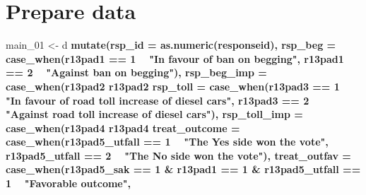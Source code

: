 \documentclass[]{book}
\newenvironment{Shaded}{\begin{snugshade}}{\end{snugshade}}
\newcommand{\KeywordTok}[1]{\textcolor[rgb]{0.13,0.29,0.53}{\textbf{#1}}}
\newcommand{\DataTypeTok}[1]{\textcolor[rgb]{0.13,0.29,0.53}{#1}}
\newcommand{\DecValTok}[1]{\textcolor[rgb]{0.00,0.00,0.81}{#1}}
\newcommand{\StringTok}[1]{\textcolor[rgb]{0.31,0.60,0.02}{#1}}
\newcommand{\OperatorTok}[1]{\textcolor[rgb]{0.81,0.36,0.00}{\textbf{#1}}}
\newcommand{\NormalTok}[1]{#1}
\begin{document}
\section{Prepare data}\label{prepare-data-7}

\begin{Shaded}
\begin{Highlighting}[]
\NormalTok{main_}\DecValTok{01}\NormalTok{ <-}\StringTok{ }\NormalTok{d }\OperatorTok{%>%}\StringTok{ }
\StringTok{  }\KeywordTok{mutate}\NormalTok{(}\DataTypeTok{rsp_id =} \KeywordTok{as.numeric}\NormalTok{(responseid),}
         \DataTypeTok{rsp_beg =} \KeywordTok{case_when}\NormalTok{(r13pad1 }\OperatorTok{==}\StringTok{ }\DecValTok{1} \OperatorTok{~}\StringTok{ "In favour of ban on begging"}\NormalTok{,}
\NormalTok{                             r13pad1 }\OperatorTok{==}\StringTok{ }\DecValTok{2} \OperatorTok{~}\StringTok{ "Against ban on begging"}\NormalTok{),}
          \DataTypeTok{rsp_beg_imp =} \KeywordTok{case_when}\NormalTok{(r13pad2 }\OperatorTok{%in%}\StringTok{ }\DecValTok{1}\OperatorTok{:}\DecValTok{2} \OperatorTok{~}\StringTok{ "Important"}\NormalTok{,}
\NormalTok{                                  r13pad2 }\OperatorTok{%in%}\StringTok{ }\DecValTok{3}\OperatorTok{:}\DecValTok{5} \OperatorTok{~}\StringTok{ "Not important"}\NormalTok{),}
         \DataTypeTok{rsp_toll =} \KeywordTok{case_when}\NormalTok{(r13pad3 }\OperatorTok{==}\StringTok{ }\DecValTok{1} \OperatorTok{~}\StringTok{ "In favour of road toll increase of diesel cars"}\NormalTok{,}
\NormalTok{                              r13pad3 }\OperatorTok{==}\StringTok{ }\DecValTok{2} \OperatorTok{~}\StringTok{ "Against road toll increase of diesel cars"}\NormalTok{),}
         \DataTypeTok{rsp_toll_imp =} \KeywordTok{case_when}\NormalTok{(r13pad4 }\OperatorTok{%in%}\StringTok{ }\DecValTok{1}\OperatorTok{:}\DecValTok{2} \OperatorTok{~}\StringTok{ "Important"}\NormalTok{,}
\NormalTok{                                  r13pad4 }\OperatorTok{%in%}\StringTok{ }\DecValTok{3}\OperatorTok{:}\DecValTok{5} \OperatorTok{~}\StringTok{ "Not important"}\NormalTok{),}
         \DataTypeTok{treat_outcome =} \KeywordTok{case_when}\NormalTok{(r13pad5_utfall }\OperatorTok{==}\StringTok{ }\DecValTok{1} \OperatorTok{~}\StringTok{ "The Yes side won the vote"}\NormalTok{,}
\NormalTok{                                 r13pad5_utfall }\OperatorTok{==}\StringTok{ }\DecValTok{2} \OperatorTok{~}\StringTok{ "The No side won the vote"}\NormalTok{),}
         \DataTypeTok{treat_outfav =} \KeywordTok{case_when}\NormalTok{(r13pad5_sak }\OperatorTok{==}\StringTok{ }\DecValTok{1} \OperatorTok{&}\StringTok{ }\NormalTok{r13pad1 }\OperatorTok{==}\StringTok{ }\DecValTok{1} \OperatorTok{&}\StringTok{ }\NormalTok{r13pad5_utfall }\OperatorTok{==}\StringTok{ }\DecValTok{1} \OperatorTok{~}\StringTok{ "Favorable outcome"}\NormalTok{,}
}}}}}
\end{Highlighting}
\end{Shaded}
\end{document}
